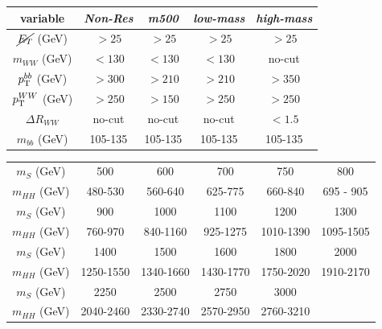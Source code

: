 \documentclass{beamer}
\newcommand*{\met}{\ensuremath{\cancel{E_{T}}}\xspace}
\newcommand*{\header}[1]{\fontsize{16}{8}\selectfont \textbf{{\color{MyPurple}{#1}}}}
\begin{document}
\begin{frame}
\begin{center}
\header{Resolved Signal Region}
\end{center}
\begin{table}
\begin{center}
\begin{tabular}{c|c|c|c|c}
 variable & \emph{Non-Res} & \emph{m500} & \emph{low-mass} & \emph{high-mass}\\
\hline
$\met$ (GeV)		&$> 25$&$>25$&$> 25$& $> 25$ \\
$m_{WW}$ (GeV) 	   		&$< 130$ &$< 130$ & $< 130$& no-cut\\
$p_{\rm T}^{bb}$ (GeV) 		&$> 300$& $> 210$&$> 210$&$> 350$\\
$p_{\rm T}^{WW}$ (GeV) 		&$> 250$&$> 150$&$> 250$&$> 250$ \\
$\Delta R_{WW}$  		&no-cut& no-cut&no-cut&$<1.5$\\
$m_{bb}$ (GeV)   		&105-135&105-135&105-135&105-135\\
\end{tabular}
\end{center}
\end{table}
\begin{table}
\begin{center}
\footnotesize
\begin{tabular}{c|c|c|c|c|c}
$m_{S}$ (GeV)      &   500   &   600   &   700   &   750   &   800 \\
$m_{HH}$  (GeV) & 480-530 & 560-640 & 625-775 & 660-840 & 695 - 905 \\ 
\hline 
$m_{S}$ (GeV)      &  900   &   1000  	   &  1100   	&  1200   		&   1300    \\
$m_{HH}$  (GeV) & 760-970	& 840-1160 & 925-1275	&1010-1390	&1095-1505  \\
\hline 
$m_{S}$ (GeV)      &   1400  		&  1500   		&  1600   		& 1800  		& 2000\\
$m_{HH}$  (GeV) &1250-1550	&1340-1660	&1430-1770	& 1750-2020 	& 1910-2170\\
\hline

\hline 
$m_{S}$ (GeV)      &   2250  		&  2500   		&  2750   		& 3000  		& \\
$m_{HH}$  (GeV) &2040-2460	&2330-2740	&2570-2950	& 2760-3210 	& \\
\end{tabular}
\end{center}
\end{table}
\end{frame}
\end{document}
